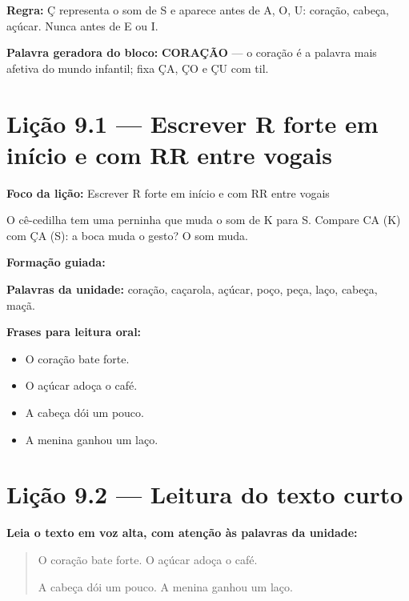 \textbf{Regra:} Ç representa o som de S e aparece antes de A, O, U: coração, cabeça, açúcar. Nunca antes de E ou I.

\textbf{Palavra geradora do bloco:} \textbf{CORAÇÃO} --- o coração é a palavra mais afetiva do mundo infantil; fixa ÇA, ÇO e ÇU com til.

\section{Lição 9.1 --- Escrever R forte em início e com RR entre vogais}

\textbf{Foco da lição:} Escrever R forte em início e com RR entre vogais


\begin{boquinha}
O cê-cedilha tem uma perninha que muda o som de K para S. Compare CA (K) com ÇA (S): a boca muda o gesto? O som muda.
\end{boquinha}

\noindent\textbf{Formação guiada:}

\begin{center}
\end{center}

\noindent\textbf{Palavras da unidade:} coração, caçarola, açúcar, poço, peça, laço, cabeça, maçã.

\noindent\textbf{Frases para leitura oral:}
\begin{itemize}[leftmargin=1.6em]
  \item O coração bate forte.
  \item O açúcar adoça o café.
  \item A cabeça dói um pouco.
  \item A menina ganhou um laço.
\end{itemize}

\section{Lição 9.2 --- Leitura do texto curto}

\noindent\textbf{Leia o texto em voz alta, com atenção às palavras da unidade:}


\begin{quote}
O coração bate forte. O açúcar adoça o café.

A cabeça dói um pouco. A menina ganhou um laço.
\end{quote}

